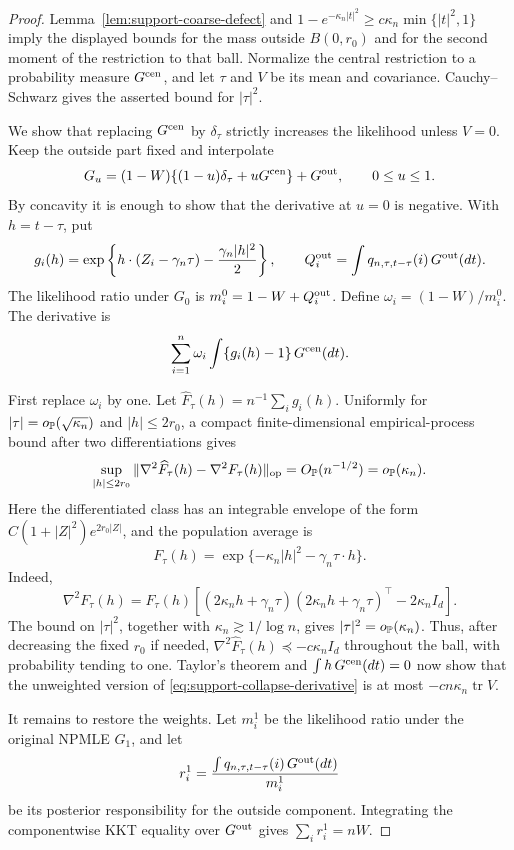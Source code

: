 \begin{proof}
Lemma~\ref{lem:support-coarse-defect} and
\(1-e^{-\kappa_n|t|^2}\ge c\kappa_n\min\{|t|^2,1\}\) imply the displayed
bounds for the mass outside \(B(0,r_0)\) and for the second moment of the
restriction to that ball. Normalize the central restriction to a probability
measure \(G^{\rm cen}\), and let \(\tau\) and \(V\) be its mean and
covariance. Cauchy--Schwarz gives the asserted bound for \(|\tau|^2\).

We show that replacing \(G^{\rm cen}\) by \(\delta_\tau\) strictly increases
the likelihood unless \(V=0\). Keep the outside part fixed and interpolate
\[
 G_u=(1-W)\{(1-u)\delta_\tau+uG^{\rm cen}\}+G^{\rm out},
 \qquad 0\le u\le1.
\]
By concavity it is enough to show that the derivative at \(u=0\) is negative.
With \(h=t-\tau\), put
\[
 g_i(h)=\exp\left\{h\cdot(Z_i-\gamma_n\tau)
                  -\frac{\gamma_n|h|^2}{2}\right\},
 \qquad
 Q_i^{\rm out}=\int q_{n,\tau,t-\tau}(i)\,G^{\rm out}(dt).
\]
The likelihood ratio under \(G_0\) is
\(m_i^0=1-W+Q_i^{\rm out}\). Define
\(\omega_i=(1-W)/m_i^0\). The derivative is
\begin{equation}
\label{eq:support-collapse-derivative}
 \sum_{i=1}^n\omega_i
 \int\{g_i(h)-1\}\,G^{\rm cen}(dt).
\end{equation}

First replace \(\omega_i\) by one. Let
\(\widehat F_\tau(h)=n^{-1}\sum_i g_i(h)\). Uniformly for
\(|\tau|=o_{\mathbb P}(\sqrt{\kappa_n})\) and \(|h|\le2r_0\), a compact
finite-dimensional empirical-process bound after two differentiations gives
\[
 \sup_{|h|\le2r_0}
 \|\nabla^2\widehat F_\tau(h)-\nabla^2F_\tau(h)\|_{\rm op}
 =O_{\mathbb P}(n^{-1/2})=o_{\mathbb P}(\kappa_n).
\]
Here the differentiated class has an integrable envelope of the form
\(C(1+|Z|^2)e^{2r_0|Z|}\), and the population average is
\[
    F_\tau(h)=\exp\{-\kappa_n|h|^2-\gamma_n\tau\cdot h\}.
\]
Indeed,
\[
 \nabla^2F_\tau(h)
 =F_\tau(h)\left[
   (2\kappa_nh+\gamma_n\tau)(2\kappa_nh+\gamma_n\tau)^\top
   -2\kappa_n I_d\right].
\]
The bound on \(|\tau|^2\), together with
\(\kappa_n\gtrsim1/\log n\), gives
\(|\tau|^2=o_{\mathbb P}(\kappa_n)\). Thus, after decreasing the fixed \(r_0\) if
needed, \(\nabla^2\widehat F_\tau(h)\preceq-c\kappa_nI_d\) throughout the
ball, with probability tending to one. Taylor's theorem and
\(\int h\,G^{\rm cen}(dt)=0\) now show that the unweighted version of
\eqref{eq:support-collapse-derivative} is at most
\(-cn\kappa_n\operatorname{tr}V\).

It remains to restore the weights. Let \(m_i^1\) be the likelihood ratio
under the original NPMLE \(G_1\), and let
\[
 r_i^1=\frac{\int q_{n,\tau,t-\tau}(i)\,G^{\rm out}(dt)}{m_i^1}
\]
be its posterior responsibility for the outside component. Integrating the
componentwise KKT equality over \(G^{\rm out}\) gives
\(\sum_i r_i^1=nW\).


\end{proof}
